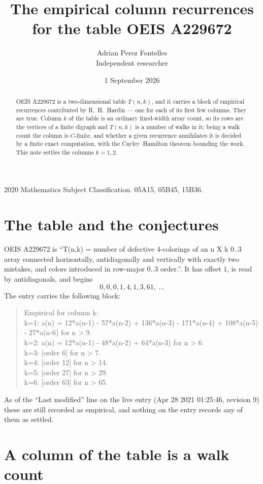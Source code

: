 \documentclass[11pt,a4paper]{article}
\title{The empirical column recurrences for the table OEIS A229672}
\author{Adrian Perez Fontelles\\ \small Independent researcher}
\date{1 September 2026}
\theoremstyle{plain}
\theoremstyle{definition}
\begin{document}
\maketitle

\begin{abstract}
OEIS A229672 is a two-dimensional table $T(n,k)$, and it carries a block of empirical
recurrences contributed by R.~H.~Hardin --- one for each of its first few columns. They are
true. Column $k$ of the table is an ordinary fixed-width array count, so its rows are the
vertices of a finite digraph and $T(n,k)$ is a number of walks in it; being a walk count the
column is $C$-finite, and whether a given recurrence annihilates it is decided by a finite
exact computation, with the Cayley--Hamilton theorem bounding the work. This note settles the columns $k=1, 2$.
\end{abstract}

\noindent\small 2020 Mathematics Subject Classification. 05A15, 05B45, 15B36.\normalsize

\section{The table and the conjectures}

OEIS A229672 is ``T(n,k) = number of defective 4-colorings of an n X k 0..3 array connected horizontally, antidiagonally and vertically with exactly two mistakes, and colors introduced in row-major 0..3 order.''. It has offset $1$, is
read by antidiagonals, and begins
\[
0, 0, 0, 1, 4, 1, 3, 61,\ \dots
\]
The entry carries the following block:
\begin{quote}\small
Empirical for column k:\\
k=1: a(n) = 12*a(n-1) - 57*a(n-2) + 136*a(n-3) - 171*a(n-4) + 108*a(n-5) - 27*a(n-6) for n > 9.\\
k=2: a(n) = 12*a(n-1) - 48*a(n-2) + 64*a(n-3) for n > 6.\\
k=3: [order 6] for n > 7.\\
k=4: [order 12] for n > 14.\\
k=5: [order 27] for n > 29.\\
k=6: [order 63] for n > 65.\\
\end{quote}
As of the ``Last modified'' line on the live entry (Apr 28 2021 01:25:46, revision 9) these are still
recorded as empirical, and nothing on the entry records any of them as settled.

\section{A column of the table is a walk count}
\end{document}
